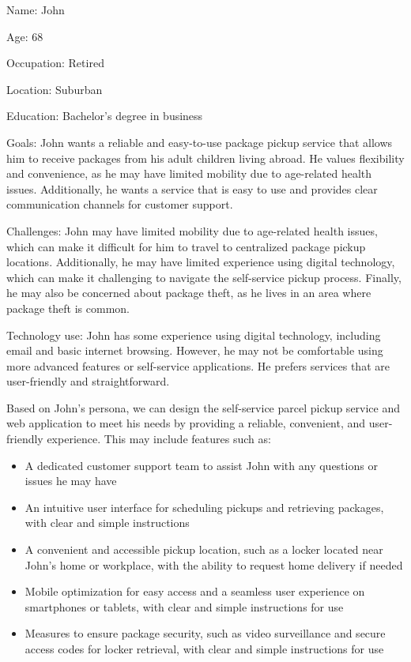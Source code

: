 Name: John

Age: 68

Occupation: Retired

Location: Suburban

Education: Bachelor's degree in business

Goals: John wants a reliable and easy-to-use package pickup service that allows him to receive packages from his adult children living abroad. He values flexibility and convenience, as he may have limited mobility due to age-related health issues. Additionally, he wants a service that is easy to use and provides clear communication channels for customer support.

Challenges: John may have limited mobility due to age-related health issues, which can make it difficult for him to travel to centralized package pickup locations. Additionally, he may have limited experience using digital technology, which can make it challenging to navigate the self-service pickup process. Finally, he may also be concerned about package theft, as he lives in an area where package theft is common.

Technology use: John has some experience using digital technology, including email and basic internet browsing. However, he may not be comfortable using more advanced features or self-service applications. He prefers services that are user-friendly and straightforward.

Based on John's persona, we can design the self-service parcel pickup service and web application to meet his needs by providing a reliable, convenient, and user-friendly experience. This may include features such as:
\begin{itemize}
    \item A dedicated customer support team to assist John with any questions or issues he may have
    \item An intuitive user interface for scheduling pickups and retrieving packages, with clear and simple instructions
    \item A convenient and accessible pickup location, such as a locker located near John's home or workplace, with the ability to request home delivery if needed
    \item Mobile optimization for easy access and a seamless user experience on smartphones or tablets, with clear and simple instructions for use
    \item Measures to ensure package security, such as video surveillance and secure access codes for locker retrieval, with clear and simple instructions for use
\end{itemize}
